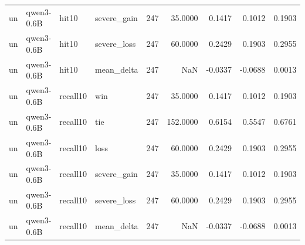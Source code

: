 \begin{tabular}{llllrrrrr}
un & qwen3-0.6B & hit10 & severe\_gain & 247 & 35.0000 & 0.1417 & 0.1012 & 0.1903 \\
un & qwen3-0.6B & hit10 & severe\_loss & 247 & 60.0000 & 0.2429 & 0.1903 & 0.2955 \\
un & qwen3-0.6B & hit10 & mean\_delta & 247 & NaN & -0.0337 & -0.0688 & 0.0013 \\
un & qwen3-0.6B & recall10 & win & 247 & 35.0000 & 0.1417 & 0.1012 & 0.1903 \\
un & qwen3-0.6B & recall10 & tie & 247 & 152.0000 & 0.6154 & 0.5547 & 0.6761 \\
un & qwen3-0.6B & recall10 & loss & 247 & 60.0000 & 0.2429 & 0.1903 & 0.2955 \\
un & qwen3-0.6B & recall10 & severe\_gain & 247 & 35.0000 & 0.1417 & 0.1012 & 0.1903 \\
un & qwen3-0.6B & recall10 & severe\_loss & 247 & 60.0000 & 0.2429 & 0.1903 & 0.2955 \\
un & qwen3-0.6B & recall10 & mean\_delta & 247 & NaN & -0.0337 & -0.0688 & 0.0013 \\
\bottomrule
\end{tabular}
